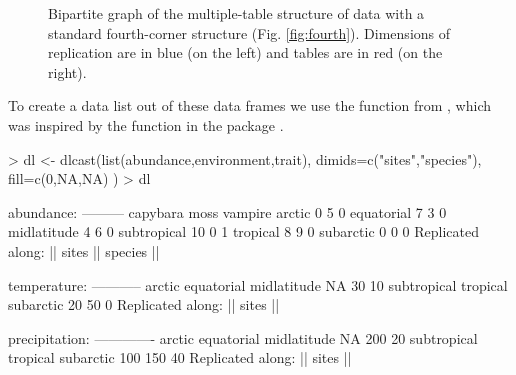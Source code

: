 \documentclass[a4paper]{report}
\begin{document}
\begin{article}
\begin{figure}
\caption{Bipartite graph of the multiple-table structure of data with a standard fourth-corner structure (Fig. \ref{fig:fourth}).  Dimensions of replication are in blue (on the left) and tables are in red (on the right).}
\label{fig:bipartite}
\end{figure}

To create a data list out of these data frames we use the  function from , which was inspired by the  function in the  package \citep{Wickham2007}.
\begin{Schunk}
\begin{Sinput}
> dl <- dlcast(list(abundance,environment,trait),
 	dimids=c("sites","species"),
 	fill=c(0,NA,NA)
 )
> dl
\end{Sinput}
\begin{Soutput}
abundance:
---------
            capybara moss vampire
arctic             0    5       0
equatorial         7    3       0
midlatitude        4    6       0
subtropical       10    0       1
tropical           8    9       0
subarctic          0    0       0
Replicated along:  || sites || species || 


temperature:
-----------
     arctic  equatorial midlatitude 
         NA          30          10 
subtropical    tropical   subarctic 
         20          50           0 
Replicated along:  || sites || 


precipitation:
-------------
     arctic  equatorial midlatitude 
         NA         200          20 
subtropical    tropical   subarctic 
        100         150          40 
Replicated along:  || sites || 



\end{Soutput}
\end{Schunk}
\end{article}
\end{document}
